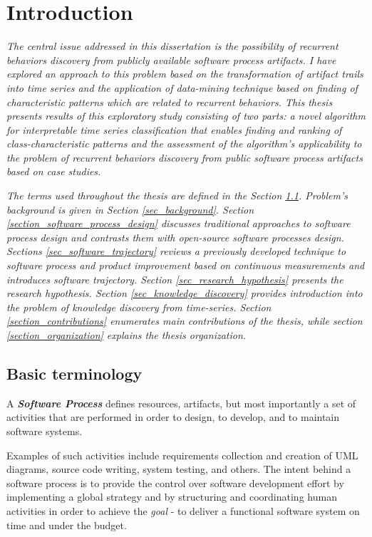 \chapter{Introduction}\label{chapter_introduction}
\textit{The central issue addressed in this dissertation is the possibility of recurrent 
behaviors discovery from publicly available software process artifacts. 
I have explored an approach to this problem based on the transformation of artifact trails into 
time series and the application of data-mining technique based on finding of characteristic 
patterns which are related to recurrent behaviors. 
This thesis presents results of this exploratory study consisting of two parts: 
a novel algorithm for interpretable time series classification that enables finding and 
ranking of class-characteristic patterns 
and the assessment of the algorithm's applicability to the problem of recurrent behaviors 
discovery from public software process artifacts based on case studies.}

\textit{The terms used throughout the thesis are defined in the Section \ref{sec_terminology}. 
Problem's background is given in Section \ref{sec_background}. 
Section \ref{section_software_process_design} discusses traditional approaches to software process 
design and contrasts them with open-source software processes design.
Sections \ref{sec_software_trajectory} reviews a previously developed technique to software process 
and product improvement based on continuous measurements and introduces software trajectory.
Section \ref{sec_research_hypothesis} presents the research hypothesis.
Section \ref{sec_knowledge_discovery} provides introduction into the problem of knowledge discovery 
from time-series.
Section \ref{section_contributions} enumerates main contributions of the thesis, 
while section \ref{section_organization} explains the thesis organization.}

\section{Basic terminology}\label{sec_terminology}
\begin{defn}\label{def_process}
A \textbf{\textit{Software Process}} defines resources, artifacts, but most importantly a set
of activities that are performed in order to design, to develop, and to maintain software systems.
\end{defn}
Examples of such activities include requirements collection and creation of UML diagrams, 
source code writing, system testing, and others. The intent behind a software process is to provide 
the control over software development effort by implementing a global strategy and by structuring
and coordinating human activities in order to achieve the \textit{goal} - to deliver a functional
software system on time and under the budget. 

